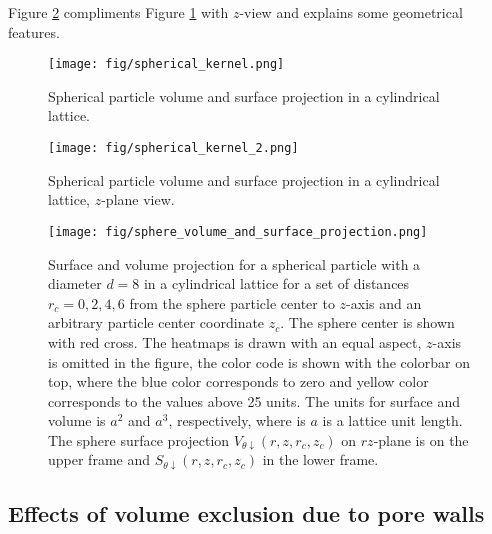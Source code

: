 \documentclass[10pt, a4paper]{article}
\begin{document}
\begin{multicols}{2}
Figure \ref{fig:spherical_kernel_2} compliments Figure \ref{fig:spherical_kernel} with $z$-view and explains some geometrical features.



\begin{figure}[H]
        \centering
        \texttt{[image: fig/spherical\_kernel.png]}
        \caption{
            Spherical particle volume and surface projection in a cylindrical lattice.
        }
        \label{fig:spherical_kernel}
    \end{figure}

\begin{figure}[H]
    \centering
    \texttt{[image: fig/spherical\_kernel\_2.png]}
    \caption{
        Spherical particle volume and surface projection in a cylindrical lattice, $z$-plane view.
    }
    \label{fig:spherical_kernel_2}
\end{figure}
    
\end{multicols}

\begin{figure}[H]
    \centering
    \texttt{[image: fig/sphere\_volume\_and\_surface\_projection.png]}
    \caption{
        Surface and volume projection for a spherical particle with a diameter $d=8$ in a cylindrical lattice for a set of distances $r_c = {0, 2, 4, 6}$ from the sphere particle center to $z$-axis and an arbitrary particle center coordinate $z_c$.
        The sphere center is shown with red cross.
        The heatmaps is drawn with an equal aspect, $z$-axis is omitted in the figure, the color code is shown with the colorbar on top, where the blue color corresponds to zero and yellow color corresponds to the values above 25 units.
        The units for surface and volume is $a^2$ and $a^3$, respectively, where is $a$ is a lattice unit length.
        The sphere surface projection $V_{\theta \downarrow}(r, z, r_c, z_c)$ on $rz$-plane is on the upper frame and $S_{\theta \downarrow}(r, z, r_c, z_c)$ in the lower frame.
    }
    \label{fig:sphere_volume_and_surface_projection}
\end{figure}


\subsection*{Effects of volume exclusion due to pore walls}
\end{document}
